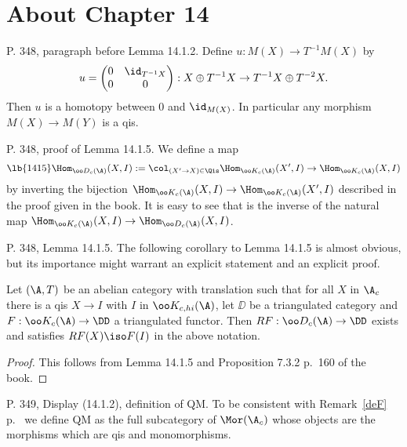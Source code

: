 \documentclass[12pt]{article}
\theoremstyle{remark}
\theoremstyle{definition}
\begin{document}

\section{About Chapter 14}


\begin{s}
P. 348, paragraph before Lemma 14.1.2. Define $u:M(X)\to T^{-1}M(X)$ by 
$$
u=\begin{pmatrix}0&\id_{T^{-1}X}\\ 0&0\end{pmatrix}:X\oplus T^{-1}X\to T^{-1}X\oplus T^{-2}X.
$$ 
Then $u$ is a homotopy between 0 and $\id_{M(X)}$. In particular any morphism $M(X)\to M(Y)$ is a qis.
\end{s}

%

\begin{s}
P. 348, proof of Lemma 14.1.5. We define a map 
\begin{equation}\lb{1415}
\Hom_{\oo D_c(\A)}(X,I):=\col_{(X'\to X)\in\Qis}\Hom_{\oo K_c(\A)}(X',I)\to\Hom_{\oo K_c(\A)}(X,I)
\end{equation}
by inverting the bijection $\Hom_{\oo K_c(\A)}(X,I)\to\Hom_{\oo K_c(\A)}(X',I)$ described in the proof given in the book. It is easy to see that  is the inverse of the natural map $\Hom_{\oo K_c(\A)}(X,I)\to\Hom_{\oo D_c(\A)}(X,I)$.
\end{s}

%

\begin{s}
P. 348, Lemma 14.1.5. The following corollary to Lemma 14.1.5 is almost obvious, but its importance might warrant an explicit statement and an explicit proof. 
\begin{cor}
Let $(\A,T)$ be an abelian category with translation such that for all $X$ in $\A_c$ there is a qis $X\to I$ with $I$ in $\oo K_{c,hi}(\A)$, let $\DD$ be a triangulated category and $F:\oo K_c(\A)\to\DD$ a triangulated functor. Then $RF:\oo D_c(\A)\to\DD$ exists and satisfies $RF(X)\iso F(I)$ in the above notation.
\end{cor} 
\begin{proof}
This follows from Lemma 14.1.5 and Proposition 7.3.2 p.~160 of the book. 
\end{proof}
\end{s}

%

\begin{s}
P. 349, Display (14.1.2), definition of QM. To be consistent with Remark~\ref{deF} p.~ we define QM as the full subcategory of $\Mor(\A_c)$ whose objects are the morphisms which are qis and monomorphisms.
\end{s}
\end{document}
